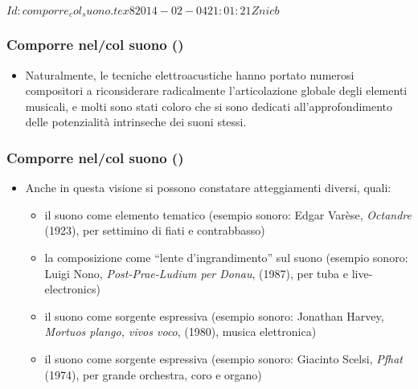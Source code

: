 %
%
\svnInfo $Id: comporre_col_suono.tex 8 2014-02-04 21:01:21Z nicb $

\setcounter{ms}{0}
\begin{frame}
    \frametitle{Comporre nel/col suono ()}

    \begin{itemize}

        \item Naturalmente, le tecniche elettroacustiche
            hanno portato numerosi compositori
            a riconsiderare radicalmente
            l'articolazione globale degli elementi musicali,
            e molti sono stati coloro che si sono
            dedicati all'approfondimento 
            delle potenzialit\`a intrinseche dei suoni stessi.

    \end{itemize}

\end{frame}

\begin{frame}
    \frametitle{Comporre nel/col suono ()}

    \begin{itemize}


        \item Anche in questa visione
            si possono constatare atteggiamenti diversi,
            quali:

        \begin{itemize}

            \item il suono come elemento tematico (esempio sonoro:
                Edgar Var\`ese, \emph{Octandre} (1923), per settimino di fiati
                e contrabbasso)

            \item la composizione come ``lente d'ingrandimento''
                sul suono (esempio sonoro:
                Luigi Nono, \emph{Post-Prae-Ludium per Donau}, (1987),
                per tuba e live-electronics)

            \item il suono come sorgente espressiva (esempio sonoro:
                Jonathan Harvey, \emph{Mortuos plango, vivos voco}, (1980),
                musica elettronica)

            \item il suono come sorgente espressiva (esempio sonoro:
                Giacinto Scelsi, \emph{Pfhat} (1974), per grande orchestra,
                coro e organo)

        \end{itemize}

    \end{itemize}

\end{frame}
